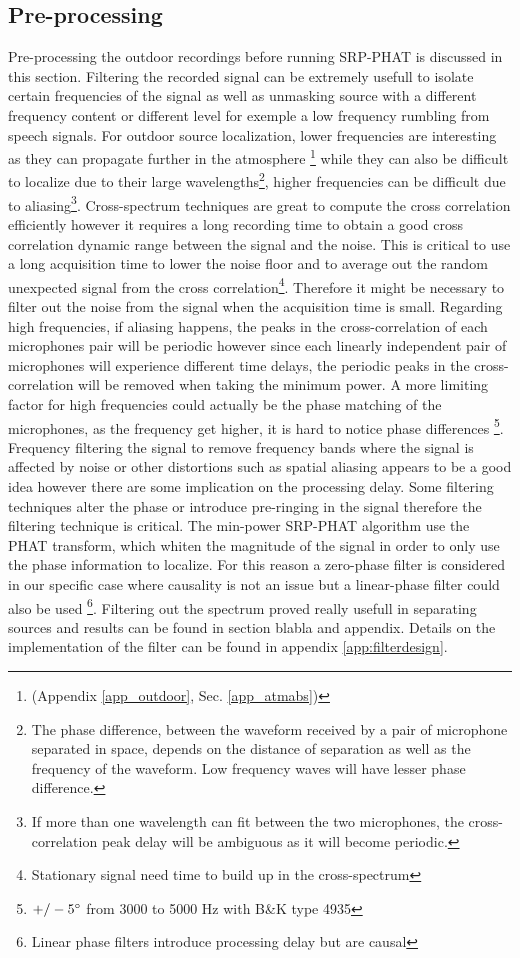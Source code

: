 \subsection{Pre-processing}

Pre-processing the outdoor recordings before running SRP-PHAT is discussed in this section. Filtering the recorded signal can be extremely usefull to isolate certain frequencies of the signal as well as unmasking source with a different frequency content or different level for exemple a low frequency rumbling from speech signals. For outdoor source localization, lower frequencies are interesting as they can propagate further in the atmosphere \footnote{(Appendix \ref{app_outdoor}, Sec. \ref{app_atmabs})} while they can also be difficult to localize due to their large wavelengths\footnote{The phase difference, between the waveform received by a pair of microphone separated in space, depends on the distance of separation as well as the frequency of the waveform. Low frequency waves will have lesser phase difference.}, higher frequencies can be difficult due to aliasing\footnote{If more than one wavelength can fit between the two microphones, the cross-correlation peak delay will be ambiguous as it will become periodic.}. Cross-spectrum techniques are great to compute the cross correlation efficiently however it requires a long recording time to obtain a good  cross correlation dynamic range between the signal and the noise. This is critical to use a long acquisition time to lower the noise floor and to average out the random unexpected signal from the cross correlation\footnote{Stationary signal need time to build up in the cross-spectrum}. Therefore it might be necessary to filter out the noise from the signal when the acquisition time is small. Regarding high frequencies, if aliasing happens, the peaks in the cross-correlation of each microphones pair will be periodic however since each linearly independent pair of microphones will experience different time delays, the periodic peaks in the cross-correlation will be removed when taking the minimum power. A more limiting factor for high frequencies could actually be the phase matching of the microphones, as the frequency get higher, it is hard to notice phase differences \footnote{$+/- 5\degree$ from 3000 to 5000 Hz with B\&K type 4935}. Frequency filtering the signal to remove frequency bands where the signal is affected by noise or other distortions such as spatial aliasing appears to be a good idea however there are some implication on the processing delay. Some filtering techniques alter the phase or introduce pre-ringing in the signal therefore the filtering technique is critical. The min-power SRP-PHAT algorithm use the PHAT transform, which whiten the magnitude of the signal in order to only use the phase information to localize. For this reason a zero-phase filter is considered in our specific case where causality is not an issue but a linear-phase filter could also be used \footnote{Linear phase filters introduce processing delay but are causal}. Filtering out the spectrum proved really usefull in separating sources and results can be found in section blabla and appendix. Details on the implementation of the filter can be found in appendix \ref{app:filterdesign}. 